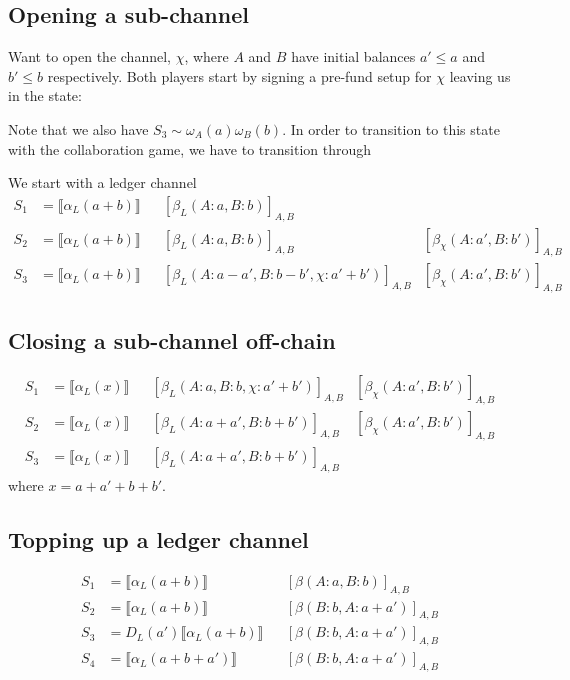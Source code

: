 \documentclass{article}
\theoremstyle{definition}
\newcommand{\adj}[1]{\llbracket #1 \rrbracket}
\newcommand{\enf}[1]{[#1]}
\begin{document}
\subsection{Opening a sub-channel}

Want to open the channel, $\chi$, where $A$ and $B$ have initial balances $a' \leq a$ and $b' \leq b$ respectively. Both players start by signing a pre-fund setup for $\chi$ leaving us in the state:

Note that we also have $S_3 \sim \omega_A(a)\omega_B(b)$. In order to transition to this state with the collaboration game, we have to transition through 

We start with a ledger channel 
\begin{align*}
S_1 &= \adj{\alpha_L(a+b)} &&\enf{\beta_L(A: a, B: b)}_{A, B} & \\
S_2 &= \adj{\alpha_L(a+b)} &&\enf{\beta_L(A: a, B: b)}_{A, B}&\enf{\beta_\chi(A: a', B: b')}_{A, B} \\
S_3 &= \adj{\alpha_L(a+b)} &&\enf{\beta_L(A: a-a', B: b-b', \chi: a' + b')}_{A, B}&\enf{\beta_\chi(A: a', B: b')}_{A, B}
\end{align*}

\subsection{Closing a sub-channel off-chain}

\begin{align*}
S_1 &= \adj{\alpha_L(x)} &&\enf{\beta_L(A: a, B: b, \chi: a' + b')}_{A, B}&\enf{\beta_\chi(A: a', B: b')}_{A, B}\\
S_2 &= \adj{\alpha_L(x)} &&\enf{\beta_L(A: a + a', B: b + b')}_{A, B}&\enf{\beta_\chi(A: a', B: b')}_{A, B} \\
S_3 &= \adj{\alpha_L(x)} &&\enf{\beta_L(A: a + a', B: b + b')}_{A, B} & 
\end{align*}
where $x = a + a' + b + b'$.

\subsection{Topping up a ledger channel}

\begin{align*}
S_1 &= \adj{\alpha_L(a + b)} &&\enf{\beta(A: a, B: b)}_{A, B} \\
S_2 &= \adj{\alpha_L(a + b)} &&\enf{\beta(B: b, A: a + a')}_{A, B} \\
S_3 &= D_L(a')\adj{\alpha_L(a + b)} &&\enf{\beta(B: b, A: a + a')}_{A, B} \\
S_4 &= \adj{\alpha_L(a + b + a')} &&\enf{\beta(B: b, A: a + a')}_{A, B}
\end{align*}
\end{document}
